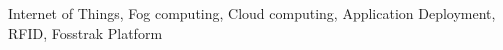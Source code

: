 
\begin{IEEEkeywords}
Internet of Things, Fog computing, Cloud computing, Application Deployment, RFID, Fosstrak Platform
\end{IEEEkeywords}
